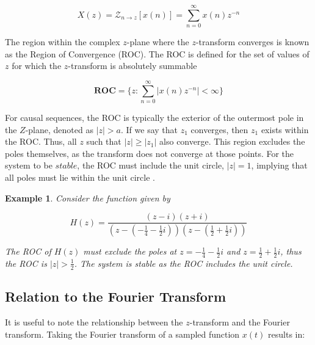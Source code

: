\documentclass[a4paper]{report}
\newtheorem{example}{Example}
\begin{document}
\begin{equation}\label{unilateral_z-transform}
X(z) = \mathcal{Z}_{n \rightarrow z}[x(n)] = \sum^{\infty}_{n = 0} x(n)z^{-n}
\end{equation}

The region within the complex $z$-plane where the $z$-transform converges is known as the Region of Convergence (ROC). The ROC is defined for the set of values of $z$ for which the $z$-transform is absolutely summable

\begin{equation}\label{roc}
\textbf{ROC} = \Biggl\{ z : \sum^{\infty}_{n = 0} |x(n)z^{-n}| < \infty \Biggr\}
\end{equation}

For causal sequences, the ROC is typically the exterior of the outermost pole in the $Z$-plane, denoted as $|z| > a$. If we say that $z_1$ converges, then $z_1$ exists within the ROC. Thus, all $z$ such that $|z| \geq |z_1|$ also converge. This region excludes the poles themselves, as the transform does not converge at those points. For the system to be $stable$, the ROC must include the unit circle, $|z| = 1$, implying that all poles must lie within the unit circle \citep{loveless2021guido}.

\begin{example}\label{example:roc_poles}
    Consider the function given by
    
    \begin{equation}
        H(z) = \frac{(z - i)(z + i)}{\left(z - \left(-\frac{1}{4} - \frac{1}{2}i\right)\right)\left(z - \left(\frac{1}{2} + \frac{1}{2}i\right)\right)}
    \end{equation}
    
    The ROC of $H(z)$ must exclude the poles at $z = -\frac{1}{4} - \frac{1}{2}i$ and $z = \frac{1}{2} + \frac{1}{2}i$, thus the ROC is $|z| > \frac{1}{2}$. The system is stable as the ROC includes the unit circle.

\end{example}

\subsection{Relation to the Fourier Transform}\label{rs_fourier_transform}
It is useful to note the relationship between the $z$-transform and the Fourier transform. Taking the Fourier transform of a sampled function $x(t)$ results in:
\end{document}

